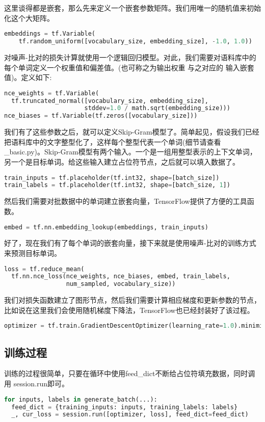 这里谈得都是嵌套，那么先来定义一个嵌套参数矩阵。我们用唯一的随机值来初始化这个大矩阵。
\begin{lstlisting}[language=Python]
embeddings = tf.Variable(
    tf.random_uniform([vocabulary_size, embedding_size], -1.0, 1.0))
\end{lstlisting}
对噪声-比对的损失计算就使用一个逻辑回归模型。对此，我们需要对语料库中的每个单词定义一个权重值和偏差值。(也可称之为输出权重 与之对应的 输入嵌套值)。定义如下:
\begin{lstlisting}[language=Python]
nce_weights = tf.Variable(
  tf.truncated_normal([vocabulary_size, embedding_size],
                      stddev=1.0 / math.sqrt(embedding_size)))
nce_biases = tf.Variable(tf.zeros([vocabulary_size]))
\end{lstlisting}我们有了这些参数之后，就可以定义Skip-Gram模型了。简单起见，假设我们已经把语料库中的文字整型化了，这样每个整型代表一个单词(细节请查看\_basic.py)。Skip-Gram模型有两个输入。一个是一组用整型表示的上下文单词，另一个是目标单词。给这些输入建立占位符节点，之后就可以填入数据了。
\begin{lstlisting}[language=Python]
train_inputs = tf.placeholder(tf.int32, shape=[batch_size])
train_labels = tf.placeholder(tf.int32, shape=[batch_size, 1])
\end{lstlisting}
然后我们需要对批数据中的单词建立嵌套向量，TensorFlow提供了方便的工具函数。
\begin{lstlisting}[language=Python]
embed = tf.nn.embedding_lookup(embeddings, train_inputs)
\end{lstlisting}
好了，现在我们有了每个单词的嵌套向量，接下来就是使用噪声-比对的训练方式来预测目标单词。
\begin{lstlisting}[language=Python]
loss = tf.reduce_mean(
  tf.nn.nce_loss(nce_weights, nce_biases, embed, train_labels,
                 num_sampled, vocabulary_size))
\end{lstlisting}
我们对损失函数建立了图形节点，然后我们需要计算相应梯度和更新参数的节点，比如说在这里我们会使用随机梯度下降法，TensorFlow也已经封装好了该过程。
\begin{lstlisting}[language=Python]
optimizer = tf.train.GradientDescentOptimizer(learning_rate=1.0).minimize(loss)
\end{lstlisting}
\subsection{训练过程}
训练的过程很简单，只要在循环中使用feed\_dict不断给占位符填充数据，同时调用 session.run即可。
\begin{lstlisting}[language=Python]
for inputs, labels in generate_batch(...):
  feed_dict = {training_inputs: inputs, training_labels: labels}
  _, cur_loss = session.run([optimizer, loss], feed_dict=feed_dict)
\end{lstlisting}
